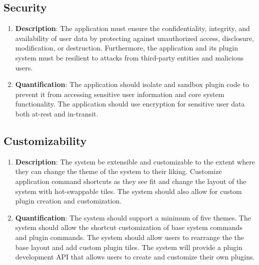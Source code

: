 \documentclass[11pt,a4paper]{article}
\begin{document}
\subsection{Security} 
\begin{enumerate}[label*=\arabic*.]
	\item[\textbullet] {\bf Description}: The application must ensure the
	confidentiality, integrity, and availability of user data by protecting
	against unauthorized access, disclosure, modification, or destruction.
	Furthermore, the application and its plugin system must be resilient to
	attacks from third-party entities and malicious users.

	\item[\textbullet] {\bf Quantification}: The application should isolate and
	sandbox plugin code to prevent it from accessing sensitive user information
	and core system functionality.  The application should use encryption for
	sensitive user data both at-rest and in-transit. 
\end{enumerate}

\subsection{Customizability}
\begin{enumerate}[label*=\arabic*.]
	\item[\textbullet] {\bf Description}: The system be extensible and
	customizable to the extent where they can change the theme of the system to
	their liking. Customize application command shortcuts as they see fit and
	change the layout of the system with hot-swappable tiles. The system should
	also allow for custom plugin creation and customization.

	\item[\textbullet] {\bf Quantification}: The system should support a minimum
	of five themes. The system should allow the shortcut customization of base
	system commands and plugin commands. The system should allow users to
	rearrange the the base layout and add custom plugin tiles. The system will
	provide a plugin development API that allows users to create and customize
	their own plugins.
\end{enumerate}
\end{document}
